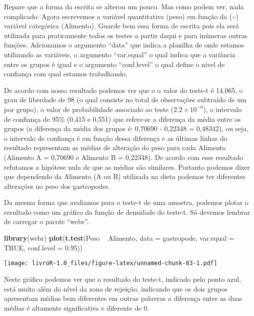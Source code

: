 \documentclass[]{book}
\newenvironment{Shaded}{\begin{snugshade}}{\end{snugshade}}
\newcommand{\DataTypeTok}[1]{\textcolor[rgb]{0.13,0.29,0.53}{#1}}
\newcommand{\FloatTok}[1]{\textcolor[rgb]{0.00,0.00,0.81}{#1}}
\newcommand{\KeywordTok}[1]{\textcolor[rgb]{0.13,0.29,0.53}{\textbf{#1}}}
\newcommand{\NormalTok}[1]{#1}
\newcommand{\OperatorTok}[1]{\textcolor[rgb]{0.81,0.36,0.00}{\textbf{#1}}}
\newcommand{\OtherTok}[1]{\textcolor[rgb]{0.56,0.35,0.01}{#1}}
\newcommand{\StringTok}[1]{\textcolor[rgb]{0.31,0.60,0.02}{#1}}
\begin{document}
Repare que a forma da escrita se alterou um pouco. Mas como podem ver, nada complicado. Agora escrevemos a variável quantitativa (peso) em função da (\textasciitilde{}) variável categórica (Alimento). Guarde bem essa forma de escrita pois ela será utilizada para praticamente todos os testes a partir daqui e para inúmeras outras funções. Adcionamos o argumento ``data'' que indica a planilha de onde estamos utilizando as variáveis, o argumento ``var.equal'' o qual indica que a variância entre os grupos é igual e o argumento ``conf.level'' o qual define o nível de confiança com qual estamos trabalhando.

De acordo com nosso resultado podemos ver que o o valor do teste-t é 14,065, o grau de liberdade de 98 (o qual consiste no total de observações subtraído de um por grupo), o valor de probabilidade associado ao teste (\(2.2\times10^{-6}\)), o intervalo de confiança de 95\% (0,415 e 0,551) que refere-se a diferença da média entre os grupos (a diferença da média dos grupos é: 0,70690 - 0,22348 = 0,48342), ou seja, o intervalo de confiança é em função dessa diferença e as últimas linhas do resultado representam as médias de alteração do peso para cada Alimento (Alimento A = 0,70690 e Alimento B = 0,22348). De acordo com esse resultado refutamos a hipótese nula de que as médias são similares. Portanto podemos dizer que dependendo da Alimento (A ou B) utilizada na dieta podemos ter diferentes alterações no peso dos gastropodes.

Da mesma forma que avaliamos para o teste-t de uma amostra, podemos plotar o resultado como um gráfico da função de densidade do teste-t. Só devemos lembrar de carregar o pacote ``webr''.

\begin{Shaded}
\begin{Highlighting}[]
\KeywordTok{library}\NormalTok{(webr)}
\KeywordTok{plot}\NormalTok{(}\KeywordTok{t.test}\NormalTok{(Peso }\OperatorTok{~}\StringTok{ }\NormalTok{Alimento, }
            \DataTypeTok{data =}\NormalTok{ gastropode,}
            \DataTypeTok{var.equal =} \OtherTok{TRUE}\NormalTok{,}
            \DataTypeTok{conf.level =} \FloatTok{0.95}\NormalTok{))}
\end{Highlighting}
\end{Shaded}

\texttt{[image: livroR-1.0\_files/figure-latex/unnamed-chunk-83-1.pdf]}

Neste gráfico podemos ver que o resultado do teste-t, indicado pelo ponto azul, está muito além do nível da zona de rejeição, indicando que os dois grupos apresentam médias bem diferentes em outras palavras a diferença entre as duas médias é altamente significativa e diferente de 0.
\end{document}

